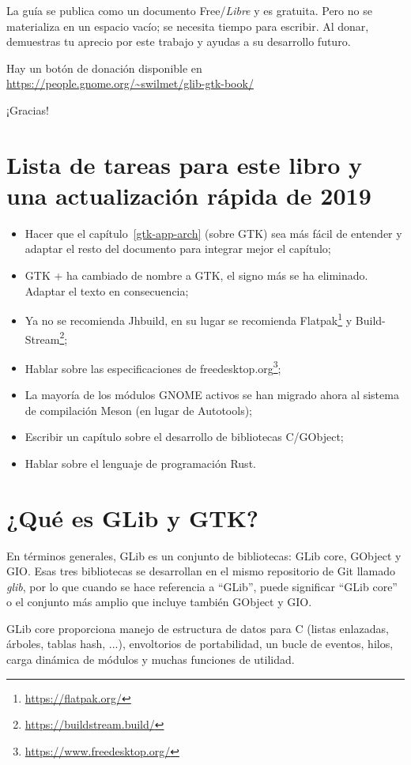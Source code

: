 La guía se publica como un documento Free/\emph{Libre} y es gratuita. Pero no se materializa en un espacio vacío; se necesita tiempo para escribir. Al donar, demuestras tu aprecio por este trabajo y ayudas a su desarrollo futuro.

Hay un botón de donación disponible en\\
\url{https://people.gnome.org/~swilmet/glib-gtk-book/}

¡Gracias!

\section{Lista de tareas para este libro y una actualización rápida de 2019}

\begin{itemize}
    \item Hacer que el capítulo~\ref{gtk-app-arch} (sobre GTK) sea más fácil de entender y adaptar el resto del documento para integrar mejor el capítulo;
    \item GTK + ha cambiado de nombre a GTK, el signo más se ha eliminado. Adaptar el texto en consecuencia;
    \item Ya no se recomienda Jhbuild, en su lugar se recomienda Flatpak\footnote{\url{https://flatpak.org/}} y Build-Stream\footnote{\url{https://buildstream.build/}};
    \item Hablar sobre las especificaciones de freedesktop.org\footnote{\url{https://www.freedesktop.org/}};
    \item La mayoría de los módulos GNOME activos se han migrado ahora al sistema de compilación Meson (en lugar de Autotools);
    \item Escribir un capítulo sobre el desarrollo de bibliotecas C/GObject;
    \item Hablar sobre el lenguaje de programación Rust.
\end{itemize}

\section{¿Qué es GLib y GTK?}

En términos generales, GLib es un conjunto de bibliotecas: GLib core, GObject y GIO. Esas tres bibliotecas se desarrollan en el mismo repositorio de Git llamado \emph{glib}, por lo que cuando se hace referencia a ``GLib'', puede significar ``GLib core'' o el conjunto más amplio que incluye también GObject y GIO.

GLib core proporciona manejo de estructura de datos para C (listas enlazadas, árboles, tablas hash, ...), envoltorios de portabilidad, un bucle de eventos, hilos, carga dinámica de módulos y muchas funciones de utilidad.

